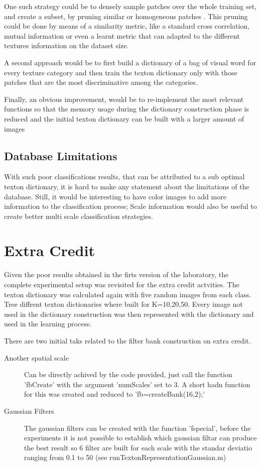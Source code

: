\documentclass[10pt,twocolumn,letterpaper]{article}
\begin{document}
One such strategy could be to densely sample patches over the whole training set, and create a subset,  by pruning similar or homogeneous patches . This pruning could be done by means of a similarity  metric, like a standard cross correlation, mutual information or even a learnt metric that can adapted to the different textures information on the dataset size.

A second approach  would be to first build a dictionary of a bag of visual word  for  every texture category and then train the texton dictionary only with those patches that are the most discriminative among the categories.

Finally, an obvious improvement, would be to re-implement the most relevant functions so that the memory usage during the dictionary construction phase is reduced and the initial texton dictionary can be built with a larger amount of images

\subsection{Database Limitations}
With such poor classifications results, that can be attributed to a sub optimal texton dictionary, it is hard to make any statement about the limitations of the database. Still, it would be interesting to have color images to add more information to the classification process; Scale information would also be useful to create better multi scale classification strategies.


\section{Extra Credit}
Given the poor results obtained in the firts version of the laboratory, the complete experimental setup was revisited for the extra credit actvities. The texton dictionary was calculated again with five random images from each class. Tree diffrent texton dictionaries where built for K=10,20,50. Every image not used in the dictionary construction was then represented with the dictionary and used in the learning process.

There are two initial taks related to the filter bank construction on extra credit. 

\begin{description}

\item[Another spatial scale] Can be directly achived by the code provided, just call the function  'fbCreate' with the argument 'numScales' set to 3. A short hadn function for this was created and reduced to 'fb=createBank(16,2);'

\item[Gaussian Filters] The gaussian filters can be created with the function 'fspecial', before the experiments it is not possible to establish which gaussian filtar can produce the best result so 6 filter are built for each scale with the standar deviatio ranging from 0.1 to 50 (see runTextonRepresentationGaussian.m)



\end{description}
\end{document}
